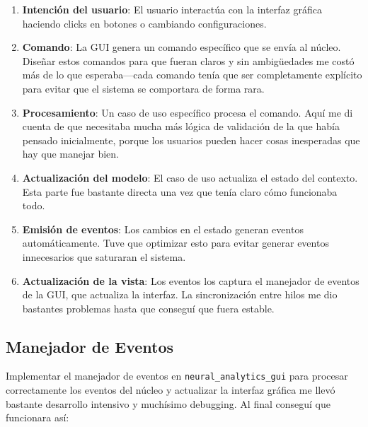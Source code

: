 \begin{enumerate}
    \item \textbf{Intención del usuario}: El usuario interactúa con la interfaz gráfica haciendo clicks en botones o cambiando configuraciones.
    \item \textbf{Comando}: La GUI genera un comando específico que se envía al núcleo. Diseñar estos comandos para que fueran claros y sin ambigüedades me costó más de lo que esperaba—cada comando tenía que ser completamente explícito para evitar que el sistema se comportara de forma rara.
    \item \textbf{Procesamiento}: Un caso de uso específico procesa el comando. Aquí me di cuenta de que necesitaba mucha más lógica de validación de la que había pensado inicialmente, porque los usuarios pueden hacer cosas inesperadas que hay que manejar bien.
    \item \textbf{Actualización del modelo}: El caso de uso actualiza el estado del contexto. Esta parte fue bastante directa una vez que tenía claro cómo funcionaba todo.
    \item \textbf{Emisión de eventos}: Los cambios en el estado generan eventos automáticamente. Tuve que optimizar esto para evitar generar eventos innecesarios que saturaran el sistema.
    \item \textbf{Actualización de la vista}: Los eventos los captura el manejador de eventos de la GUI, que actualiza la interfaz. La sincronización entre hilos me dio bastantes problemas hasta que conseguí que fuera estable.
\end{enumerate}

\subsection{Manejador de Eventos}

Implementar el manejador de eventos en \texttt{neural\_analytics\_gui} para procesar correctamente los eventos del núcleo y actualizar la interfaz gráfica me llevó bastante desarrollo intensivo y muchísimo debugging. Al final conseguí que funcionara así:

